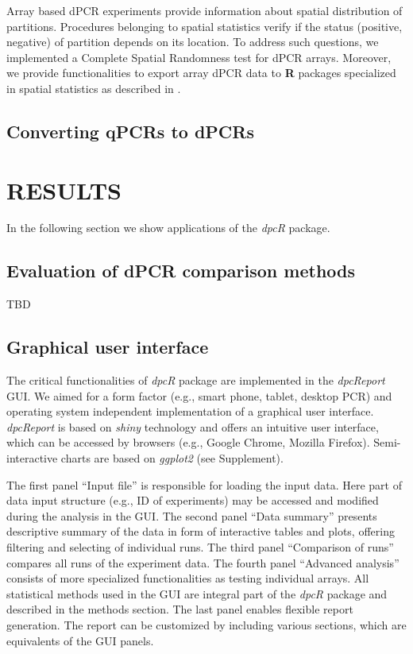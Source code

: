 \documentclass[a4,center,fleqn]{NAR}
\begin{document}
Array based dPCR experiments provide information about spatial distribution of 
partitions. Procedures belonging to spatial statistics verify if the status 
(positive, negative) of partition depends on its location. To address such 
questions, we implemented a Complete Spatial Randomness test for dPCR arrays. 
Moreover, we provide functionalities to export array dPCR data to \textbf{R} 
packages specialized in spatial statistics as described in 
\cite{Baddeley_2015}.

\subsection{Converting qPCRs to dPCRs}



\section{RESULTS}

In the following section we show applications of the \textit{dpcR} package.

\subsection{Evaluation of dPCR comparison methods}

TBD

\subsection{Graphical user interface}

The critical functionalities of \textit{dpcR} package are implemented in the 
\textit{dpcReport} GUI. We aimed for a form factor (e.g., smart phone, tablet, 
desktop PCR) and operating system independent implementation of a graphical 
user 
interface. \textit{dpcReport} is based on \textit{shiny} technology and offers 
an intuitive user interface, which can be accessed by browsers (e.g., Google 
Chrome, Mozilla Firefox). Semi-interactive charts are based on \textit{ggplot2} 
(see Supplement).

The first panel ``Input file'' is responsible for loading the input data. Here 
part of data input structure (e.g., ID of experiments) may be accessed and 
modified during the analysis in the GUI. The second panel ``Data summary'' 
presents descriptive summary of the data in form of interactive tables and 
plots, offering filtering and selecting of individual runs. The third panel 
``Comparison of runs'' compares all runs of the experiment data. The fourth 
panel ``Advanced analysis'' consists of more specialized functionalities as 
testing individual arrays. All statistical methods used in the GUI are integral 
part of the \textit{dpcR} package and described in the methods section. The 
last 
panel enables flexible report generation. The report can be customized by 
including various sections, which are equivalents of the GUI panels.
\end{document}
